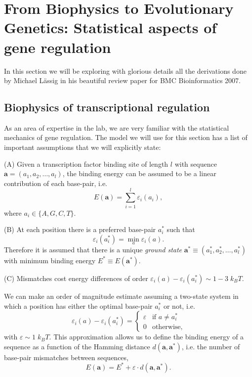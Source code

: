 \section{From Biophysics to Evolutionary Genetics: Statistical aspects of gene
regulation}

In this section we will be exploring with glorious details all the derivations
done by Michael L\"{a}ssig in his beautiful review paper for BMC Bioinformatics
2007.

\subsection{Biophysics of transcriptional regulation}
As an area of expertise in the lab, we are very familiar with the statistical
mechanics of gene regulation. The model we will use for this section has a list
of important assumptions that we will explicitly state:

(A) Given a transcription factor binding site of length $l$ with sequence
$\mathbf{a} = (a_1, a_2, \ldots, a_l)$, the binding energy can be assumed to be
a linear contribution of each base-pair, i.e.
\begin{equation}
  E(\mathbf{a}) = \sum_{i=1}^l \varepsilon_i (a_i),
\end{equation}
where $a_i \in \{A, G, C, T \}$.

(B) At each position there is a preferred base-pair $a_i^*$ such that
\begin{equation}
  \varepsilon_i (a_i^*) = \min_a \varepsilon_i(a).
\end{equation}
Therefore it is assumed that there is a unique {\it ground state} $\mathbf{a}^*
\equiv (a_1^*, a_2^*, \ldots, a_l^*)$ with minimum binding energy $E^* \equiv
E(\mathbf{a}^*)$.

(C) Mismatches cost energy differences of order $\varepsilon_i (a) -
\varepsilon_i (a_i^*) \sim 1-3 \; k_BT$.

We can make an order of magnitude estimate assuming a two-state system in which
a position has either the optimal base-pair $a_i^*$ or not, i.e.
\begin{equation}
\varepsilon_i (a) - \varepsilon_i (a_i^*) =
\begin{cases}
  \varepsilon & \text{if } a \neq a_i^*\\
  0 & \text{otherwise},
\end{cases}
\end{equation}
with $\varepsilon \sim 1 \; k_BT$. This approximation allows us to define the
binding energy of a sequence as a function of the Hamming distance
$d(\mathbf{a}, \mathbf{a^*})$, i.e. the number of base-pair mismatches between
sequences,
\begin{equation}
  E(\mathbf{a}) = E^* + \varepsilon \cdot d(\mathbf{a}, \mathbf{a^*}).
\end{equation}

